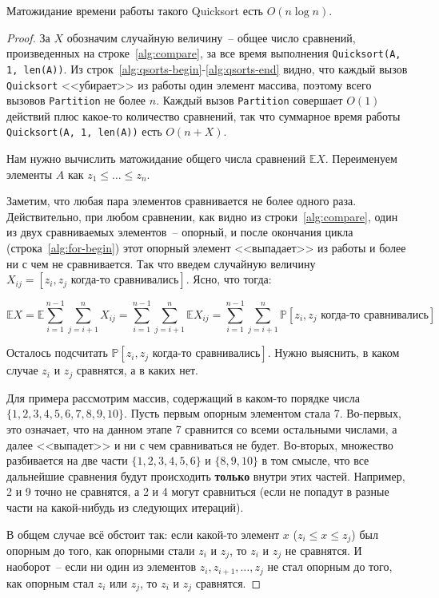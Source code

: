 \begin{theorem*}
    Матожидание времени работы такого {\normalfont\ttfamily Quicksort} есть $O(n\log n)$.
\end{theorem*}
\begin{proof}
    За $X$ обозначим случайную величину~-- общее число сравнений, произведенных на строке~\ref{alg:compare}, за все время выполнения \texttt{Quicksort(A, 1, len(A))}. Из строк~\ref{alg:qsorts-begin}-\ref{alg:qsorts-end} видно, что каждый вызов \texttt{Quicksort} <<убирает>> из работы один элемент массива, поэтому всего вызовов \texttt{Partition} не более $n$. Каждый вызов \texttt{Partition} совершает $O(1)$ действий плюс какое-то количество сравнений, так что суммарное время работы \texttt{Quicksort(A, 1, len(A))} есть $O(n+X)$.

    Нам нужно вычислить матожидание общего числа сравнений $\mathbb E X$. Переименуем элементы $A$ как $z_1 \leq \ldots \leq z_n$.

    Заметим, что любая пара элементов сравнивается не более одного раза. Действительно, при любом сравнении, как видно из строки~\ref{alg:compare}, один из двух сравниваемых элементов~-- опорный, и после окончания цикла (строка~\ref{alg:for-begin}) этот опорный элемент <<выпадает>> из работы и более ни с чем не сравнивается. Так что введем случайную величину $X_{ij} = [z_i, z_j \text{ когда-то сравнивались}]$. Ясно, что тогда:

    $$\mathbb E X = \mathbb E \sum_{i=1}^{n-1} \sum_{j=i+1}^n X_{ij} = \sum_{i=1}^{n-1} \sum_{j=i+1}^n \mathbb E X_{ij} = \sum_{i=1}^{n-1} \sum_{j=i+1}^n \mathbb P[z_i, z_j \text{ когда-то сравнивались}]$$

    Осталось подсчитать $\mathbb P[z_i, z_j\text{ когда-то сравнивались}]$. Нужно выяснить, в каком случае $z_i$ и $z_j$ сравнятся, а в каких нет.

    Для примера рассмотрим массив, содержащий в каком-то порядке числа $\{1,2,3,4,5,6,7,8,9,10\}$. Пусть первым опорным элементом стала 7. Во-первых, это означает, что на данном этапе 7 сравнится со всеми остальными числами, а далее <<выпадет>> и ни с чем сравниваться не будет. Во-вторых, множество разбивается на две части $\{1,2,3,4,5,6\}$ и $\{8,9,10\}$ в том смысле, что все дальнейшие сравнения будут происходить \textbf{только} внутри этих частей. Например, 2 и 9 точно не сравнятся, а 2 и 4 могут сравниться (если не попадут в разные части на какой-нибудь из следующих итераций).

    В общем случае всё обстоит так: если какой-то элемент $x$ ($z_i \leq x \leq z_j$) был опорным до того, как опорными стали $z_i$ и $z_j$, то $z_i$ и $z_j$ не сравнятся. И наоборот~-- если ни один из элементов $z_i, z_{i+1},\ldots, z_j$ не стал опорным до того, как опорным стал $z_i$ или $z_j$, то $z_i$ и $z_j$ сравнятся.


\end{proof}
